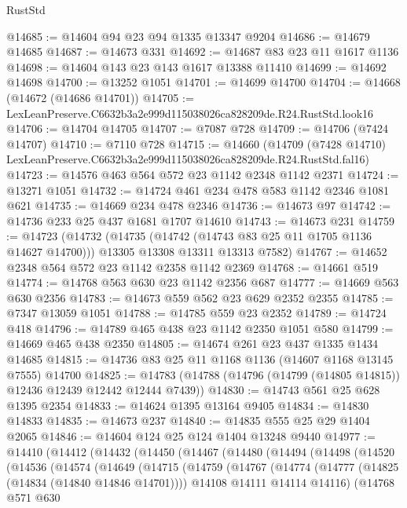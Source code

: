 \begin{lexlean}{RustStd}
\begin{coremodule}
@14685 := @14604 @94 @23 @94 @1335 @13347 @9204
@14686 := @14679 @14685
@14687 := @14673 @331
@14692 := @14687 @83 @23 @11 @1617 @1136
@14698 := @14604 @143 @23 @143 @1617 @13388 @11410
@14699 := @14692 @14698
@14700 := @13252 @1051
@14701 := @14699 @14700
@14704 := @14668 (@14672 (@14686 @14701))
@14705 := LexLeanPreserve.C6632b3a2e999d115038026ca828209de.R24.RustStd.look16
@14706 := @14704 @14705
@14707 := @7087 @728
@14709 := @14706 (@7424 @14707)
@14710 := @7110 @728
@14715 := @14660
    (@14709 (@7428 @14710) LexLeanPreserve.C6632b3a2e999d115038026ca828209de.R24.RustStd.fal16)
@14723 := @14576 @463 @564 @572 @23 @1142 @2348 @1142 @2371
@14724 := @13271 @1051
@14732 := @14724 @461 @234 @478 @583 @1142 @2346 @1081 @621
@14735 := @14669 @234 @478 @2346
@14736 := @14673 @97
@14742 := @14736 @233 @25 @437 @1681 @1707 @14610
@14743 := @14673 @231
@14759 := @14723
    (@14732
      (@14735 (@14742 (@14743 @83 @25 @11 @1705 @1136 @14627 @14700)))
      @13305
      @13308
      @13311
      @13313
      @7582)
@14767 := @14652 @2348 @564 @572 @23 @1142 @2358 @1142 @2369
@14768 := @14661 @519
@14774 := @14768 @563 @630 @23 @1142 @2356 @687
@14777 := @14669 @563 @630 @2356
@14783 := @14673 @559 @562 @23 @629 @2352 @2355
@14785 := @7347 @13059 @1051
@14788 := @14785 @559 @23 @2352
@14789 := @14724 @418
@14796 := @14789 @465 @438 @23 @1142 @2350 @1051 @580
@14799 := @14669 @465 @438 @2350
@14805 := @14674 @261 @23 @437 @1335 @1434 @14685
@14815 := @14736 @83 @25 @11 @1168 @1136 (@14607 @1168 @13145 @7555) @14700
@14825 := @14783 (@14788 (@14796 (@14799 (@14805 @14815)) @12436 @12439 @12442 @12444 @7439))
@14830 := @14743 @561 @25 @628 @1395 @2354
@14833 := @14624 @1395 @13164 @9405
@14834 := @14830 @14833
@14835 := @14673 @237
@14840 := @14835 @555 @25 @29 @1404 @2065
@14846 := @14604 @124 @25 @124 @1404 @13248 @9440
@14977 := @14410
    (@14412
      (@14432
        (@14450
          (@14467
            (@14480
              (@14494
                (@14498
                  (@14520
                    (@14536
                      (@14574
                        (@14649
                          (@14715
                            (@14759
                              (@14767
                                (@14774
                                  (@14777 (@14825 (@14834 (@14840 @14846 @14701))))
                                  @14108
                                  @14111
                                  @14114
                                  @14116)
                                (@14768
                                  @571
                                  @630

\end{coremodule}
\end{lexlean}
